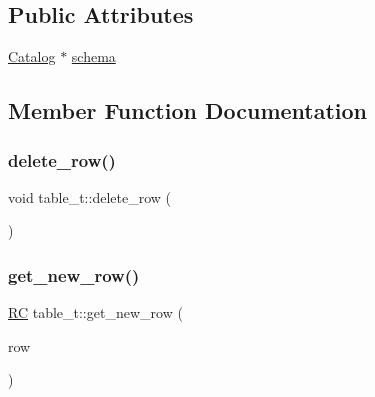 \subsection*{Public Attributes}
\begin{DoxyCompactItemize}
\item 
\hyperlink{classCatalog}{Catalog} $\ast$ \hyperlink{classtable__t_a5e2b3478c29080f6106331294d94c06a}{schema}
\end{DoxyCompactItemize}


\subsection{Member Function Documentation}
\mbox{\label{classtable__t_a1d5c3dd5d88ca99b1f9ec01f4befe4e2}} 
\subsubsection{\texorpdfstring{delete\+\_\+row()}{delete\_row()}}
{\footnotesize\ttfamily void table\+\_\+t\+::delete\+\_\+row (\begin{DoxyParamCaption}{ }\end{DoxyParamCaption})}

\mbox{\label{classtable__t_a17daa6c0ecb46c33745c1ce88f80a495}} 
\subsubsection{\texorpdfstring{get\+\_\+new\+\_\+row()}{get\_new\_row()}\hspace{0.1cm}{\footnotesize\ttfamily [1/2]}}
{\footnotesize\ttfamily \hyperlink{global_8h_a78c49a674c810fdd03d20432f7be864a}{RC} table\+\_\+t\+::get\+\_\+new\+\_\+row (\begin{DoxyParamCaption}\item[{\hyperlink{classrow__t}{row\+\_\+t} $\ast$\&}]{row }\end{DoxyParamCaption})}

\mbox{\label{classtable__t_a81e3bd8f424fc3346629dba6a54eab15}} 
